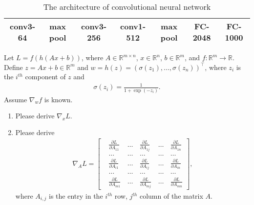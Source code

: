 \documentclass[11pt,letter,notitlepage]{article}
\begin{document}
\begin{table}[h]
	\centering
	\begin{tabular}{|c|c|c|c|c|c|c|}
		\hline
		conv3-64& max pool& conv3-256& conv1-512& max pool&FC-2048& FC-1000\\
		\hline
	\end{tabular}
	\caption{The architecture of convolutional neural network} \label{tab:cnn}
\end{table}
\begin{solution}

\end{solution}

\newpage

\begin{exercise}
	
	\indent Let $L = f(h(Ax+b))$, where $A \in \mathbb{R}^{m \times n}$, $x \in \mathbb{R}^n$, $b \in \mathbb{R}^m$, and $f: \mathbb{R}^m \rightarrow \mathbb{R}$. Define $z =  Ax + b \in \mathbb{R}^m$ and $w =  h(z)  = ( \sigma(z_1),\ldots,\sigma(z_n) )^{\top}$, where $z_i$ is the $i^{th}$ component of $z$ and
	\begin{align*}
	   \sigma(z_i) = \frac{1}{1+\exp(-z_i)}. 
	\end{align*}
	Assume $\nabla_w f$ is known.
	\begin{enumerate}
		\item Please derive $\nabla_{x}L$.
		\item Please derive
		\begin{align*}
		    \nabla_{A}L = \left[
		    \begin{matrix}
		        &\frac{\partial L}{\partial A_{11}} &\, \dots \, &\frac{\partial L}{\partial A_{1j}} &\, \dots \, &\frac{\partial L}{\partial A_{1n}}\\
		        &\dots &\, \dots \, &\dots &\, \dots \, &\dots \\
		        &\frac{\partial L}{\partial A_{i1}} &\, \dots \, &\frac{\partial L}{\partial A_{ij}} &\, \dots \, &\frac{\partial L}{\partial A_{in}}\\
		        &\dots &\, \dots \, &\dots &\, \dots \, &\dots \\
		        &\frac{\partial L}{\partial A_{m1}} &\, \dots \, &\frac{\partial L}{\partial A_{mj}} &\, \dots \, &\frac{\partial L}{\partial A_{mn}}
		    \end{matrix}
		    \right],
		\end{align*}
		where $A_{i,j}$ is the entry in the $i^{th}$ row, $j^{th}$ column of the matrix $A$.
	\end{enumerate} 
	
\end{exercise}
\begin{solution}

\end{solution}



\end{document}

